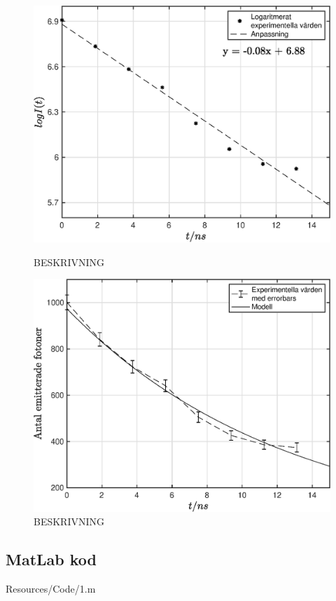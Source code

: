 \begin{figure}[H]
        \includegraphics[width=\linewidth]{Resources/Graphics/fig1_2.eps}
        \caption{BESKRIVNING}\label{fig:1_2}
    \endminipage\hfill
        \includegraphics[width=\linewidth]{Resources/Graphics/fig1_3.eps}
        \caption{BESKRIVNING}\label{fig:1_3}
    \endminipage
\end{figure}


\np
\subsection*{MatLab kod}

 {Resources/Code/1.m}